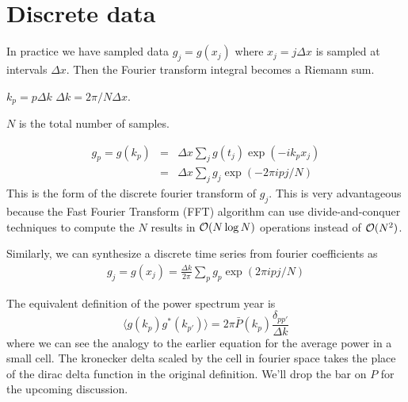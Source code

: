 \section{Discrete data}

In practice we have sampled data $g_j = g(x_j)$ where $x_j = j\Delta x$ is sampled at intervals $\Delta x$.  Then the Fourier transform integral becomes a Riemann sum.


$k_p = p\Delta k$
$\Delta k = 2\pi/N\Delta x$.

$N$ is the total number of samples.

\begin{eqnarray}%
  g_p = g(k_p) & = & \Delta x \sum_j g(t_j) \exp(- i k_p  x_j) \\
    & = & \Delta x \sum_j g_j \exp(-2\pi i pj/N)
\end{eqnarray}
 This is the form of the discrete fourier transform of $g_j$.  This is very advantageous because the Fast Fourier Transform (FFT) algorithm can use divide-and-conquer techniques to compute the $N$ results in ${\cal O}(N \log N)$ operations instead of ${\cal O}(N^2)$.

 Similarly, we can synthesize a discrete time series from fourier coefficients as
 \begin{eqnarray}
   g_j = g(x_j) = \frac{\Delta k}{2\pi}  \sum_p g_p \exp(2\pi i pj/N)
 \end{eqnarray}

 The equivalent definition of the power spectrum year is
 \begin{equation}
   \langle g(k_p) g^*(k_{p'}) \rangle = 2\pi \bar P(k_p) \frac{\delta_{pp'}}{\Delta k}
  \end{equation}
 where we can see the analogy to the earlier equation for the average power in a small cell.  The kronecker delta scaled by the cell in fourier space takes the place of the dirac delta function in the original definition.  We'll drop the bar on $P$ for the upcoming discussion.


 
